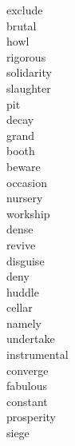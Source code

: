\documentclass[a4paper, 10pt]{ctexart}
\begin{document}
\begin{multicols*}{2}
\begin{description}
\item[exclude]

\item[brutal]

\item[howl]

\item[rigorous]

\item[solidarity]

\item[slaughter]

\item[pit]

\item[decay]

\item[grand]

\item[booth]

\item[beware]

\item[occasion]

\item[nursery]

\item[workship]

\item[dense]

\item[revive]

\item[disguise]

\item[deny]

\item[huddle]

\item[cellar]

\item[namely]

\item[undertake]

\item[instrumental]

\item[converge]

\item[fabulous]

\item[constant]

\item[prosperity]

\item[siege]


\end{description}
\end{multicols*}
\end{document}
